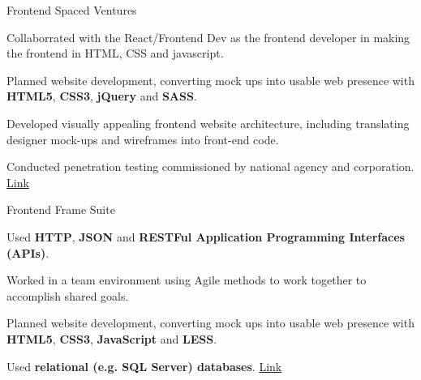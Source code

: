 

\begin{cventries}

  \cventry
    {Frontend} %
    {Spaced Ventures} %
    {} %
    {} %
    {
      \begin{cvitems} %
        \item {Collaborrated with the React/Frontend Dev as the frontend developer in making the frontend in HTML, CSS and javascript.}
        \item {Planned website development, converting mock ups into usable web presence with \textbf{HTML5}, \textbf{CSS3}, \textbf{jQuery} and \textbf{SASS}.}
        \item {Developed visually appealing frontend website architecture, including translating designer mock-ups and wireframes into front-end code.}
        \item {Conducted penetration testing commissioned by national agency and corporation.}
        {\href{https://www.spacedventures.com/}{Link}}
      \end{cvitems}
    }

  \cventry
    {Frontend} %
    {Frame Suite} %
    {} %
    {} %
    {
      \begin{cvitems} %
        \item {Used \textbf{HTTP}, \textbf{JSON} and \textbf{RESTFul Application Programming Interfaces (APIs)}.}
        \item {Worked in a team environment using Agile methods to work together to accomplish shared goals.}
        \item {Planned website development, converting mock ups into usable web presence with \textbf{HTML5}, \textbf{CSS3}, \textbf{JavaScript} and \textbf{LESS}.}
        \item {Used \textbf{relational (e.g. SQL Server) databases}.}
        {\href{https://store.framesuite.com/}{Link}}
      \end{cvitems}
    }

\end{cventries}
